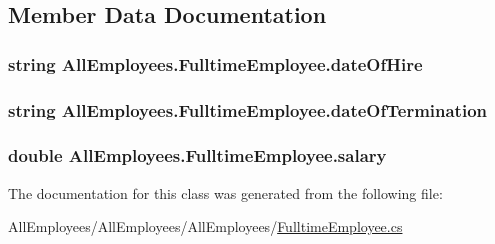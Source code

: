 \subsection{Member Data Documentation}
\hypertarget{class_all_employees_1_1_fulltime_employee_a017478702f4675eeb71fee1bdc3a155c}{}
\subsubsection[{date\+Of\+Hire}]{\setlength{\rightskip}{0pt plus 5cm}string All\+Employees.\+Fulltime\+Employee.\+date\+Of\+Hire}\label{class_all_employees_1_1_fulltime_employee_a017478702f4675eeb71fee1bdc3a155c}
\hypertarget{class_all_employees_1_1_fulltime_employee_acf523a8b0c287762d3db8b2ab5604815}{}
\subsubsection[{date\+Of\+Termination}]{\setlength{\rightskip}{0pt plus 5cm}string All\+Employees.\+Fulltime\+Employee.\+date\+Of\+Termination}\label{class_all_employees_1_1_fulltime_employee_acf523a8b0c287762d3db8b2ab5604815}
\hypertarget{class_all_employees_1_1_fulltime_employee_ad52581c3ee723884cc6b34111cac53b7}{}
\subsubsection[{salary}]{\setlength{\rightskip}{0pt plus 5cm}double All\+Employees.\+Fulltime\+Employee.\+salary}\label{class_all_employees_1_1_fulltime_employee_ad52581c3ee723884cc6b34111cac53b7}


The documentation for this class was generated from the following file\+:\begin{DoxyCompactItemize}
\item 
All\+Employees/\+All\+Employees/\+All\+Employees/\hyperlink{_fulltime_employee_8cs}{Fulltime\+Employee.\+cs}\end{DoxyCompactItemize}
